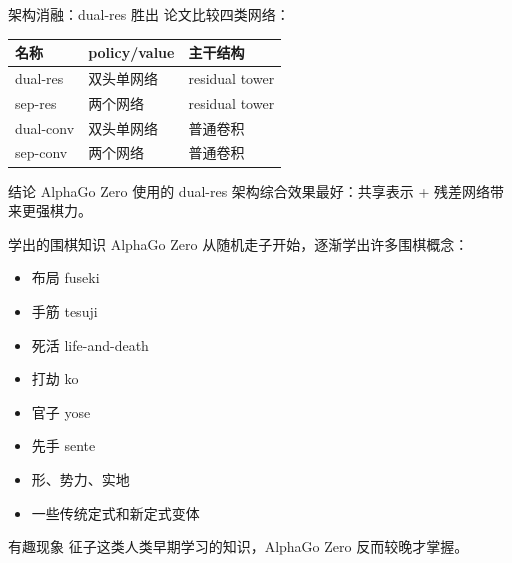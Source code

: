 \documentclass[UTF8,aspectratio=169,10pt]{ctexbeamer}
\begin{document}
\begin{frame}{架构消融：dual-res 胜出}
  论文比较四类网络：

  \begin{center}
    \begin{tabular}{@{}p{}p{}p{}@{}}
      \toprule
      名称 & policy/value & 主干结构 \\
      \midrule
      dual-res & 双头单网络 & residual tower \\
      sep-res & 两个网络 & residual tower \\
      dual-conv & 双头单网络 & 普通卷积 \\
      sep-conv & 两个网络 & 普通卷积 \\
      \bottomrule
    \end{tabular}
  \end{center}

  \begin{block}{结论}
    AlphaGo Zero 使用的 dual-res 架构综合效果最好：共享表示 + 残差网络带来更强棋力。
  \end{block}
\end{frame}

\begin{frame}{学出的围棋知识}
  AlphaGo Zero 从随机走子开始，逐渐学出许多围棋概念：

  \begin{itemize}
    \item 布局 fuseki
    \item 手筋 tesuji
    \item 死活 life-and-death
    \item 打劫 ko
    \item 官子 yose
    \item 先手 sente
    \item 形、势力、实地
    \item 一些传统定式和新定式变体
  \end{itemize}

  \begin{alertblock}{有趣现象}
    征子这类人类早期学习的知识，AlphaGo Zero 反而较晚才掌握。
  \end{alertblock}
\end{frame}
\end{document}
